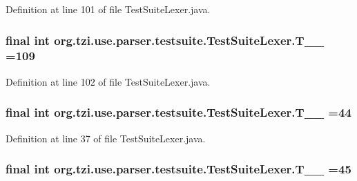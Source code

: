 Definition at line 101 of file Test\-Suite\-Lexer.\-java.

\hypertarget{classorg_1_1tzi_1_1use_1_1parser_1_1testsuite_1_1_test_suite_lexer_af259acc44a9637a8b27d366a43924250}{
\subsubsection[{T\-\_\-\-\_\-109}]{\setlength{\rightskip}{0pt plus 5cm}final int org.\-tzi.\-use.\-parser.\-testsuite.\-Test\-Suite\-Lexer.\-T\-\_\-\-\_ =109\hspace{0.3cm}{\ttfamily [static]}}}\label{classorg_1_1tzi_1_1use_1_1parser_1_1testsuite_1_1_test_suite_lexer_af259acc44a9637a8b27d366a43924250}


Definition at line 102 of file Test\-Suite\-Lexer.\-java.

\hypertarget{classorg_1_1tzi_1_1use_1_1parser_1_1testsuite_1_1_test_suite_lexer_adc2b1948c81fffce4304acfffd7b9fb6}{
\subsubsection[{T\-\_\-\-\_\-44}]{\setlength{\rightskip}{0pt plus 5cm}final int org.\-tzi.\-use.\-parser.\-testsuite.\-Test\-Suite\-Lexer.\-T\-\_\-\-\_ =44\hspace{0.3cm}{\ttfamily [static]}}}\label{classorg_1_1tzi_1_1use_1_1parser_1_1testsuite_1_1_test_suite_lexer_adc2b1948c81fffce4304acfffd7b9fb6}


Definition at line 37 of file Test\-Suite\-Lexer.\-java.

\hypertarget{classorg_1_1tzi_1_1use_1_1parser_1_1testsuite_1_1_test_suite_lexer_a703da1f8060f88b0102cf65ccc4cd15b}{
\subsubsection[{T\-\_\-\-\_\-45}]{\setlength{\rightskip}{0pt plus 5cm}final int org.\-tzi.\-use.\-parser.\-testsuite.\-Test\-Suite\-Lexer.\-T\-\_\-\-\_ =45\hspace{0.3cm}{\ttfamily [static]}}}\label{classorg_1_1tzi_1_1use_1_1parser_1_1testsuite_1_1_test_suite_lexer_a703da1f8060f88b0102cf65ccc4cd15b}


